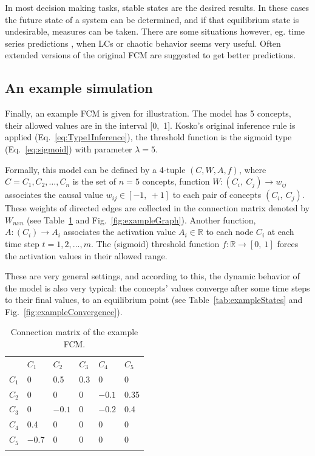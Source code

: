 \documentclass[graybox]{svmult}
\begin{document}
In most decision making tasks, stable states are the desired results. In these cases the future state of a system can be determined, and if that equilibrium state is undesirable, measures can be taken. There are some situations however, eg. time series predictions \cite{homenda2014modeling,homenda2017clustering,lu2014modeling}, when LCs or chaotic behavior seems very useful. Often extended versions of the original FCM are suggested to get better predictions.

\subsection{An example simulation}

Finally, an example FCM is given for illustration. The model has 5 concepts, their allowed values are in the interval [0,~1]. Kosko's original inference rule is applied (Eq.~\ref{eq:Type1Inference}), the threshold function is the sigmoid type (Eq.~\ref{eq:sigmoid}) with parameter $\lambda = 5$.

Formally, this model can be defined by a 4-tuple $(C, W, A, f)$, where $C = C_1, C_2,\dots, C_n$ is the set of $n=5$ concepts, function $W : (C_i,~C_j) \to w_{ij}$ associates the causal value $w_{ij} \in [-1,~+1]$ to each pair of concepts $(C_i,~C_j)$. These weights of directed edges are collected in the connection matrix denoted by $W_{nxn}$ (see Table~\ref{tab:exampleConnMtx} and Fig.~\ref{fig:exampleGraph}). Another function, $A : (C_i) \to A_i$ associates the activation value $A_i \in \mathbb{R}$ to each node $C_i$ at each time step $t = 1, 2,\dots, m$. The (sigmoid) threshold function $f : \mathbb{R} \to [0,~1]$ forces the activation values in their allowed range.

These are very general settings, and according to this, the dynamic behavior of the model is also very typical: the concepts' values converge after some time steps to their final values, to an equilibrium point (see Table~\ref{tab:exampleStates} and Fig.~\ref{fig:exampleConvergence}).

\begin{table}[!t]
\caption{Connection matrix of the example FCM.}
\label{tab:exampleConnMtx}
\begin{tabular}{p{1cm}|p{1cm}p{1cm}p{1cm}p{1cm}p{1cm}}
\hline\noalign{\smallskip}
 & $C_1$ & $C_2$ & $C_3$ & $C_4$ & $C_5$ \\
\noalign{\smallskip}\svhline\noalign{\smallskip}
$C_1$ & 0 & 0.5 & 0.3 & 0 & 0 \\
$C_2$ & 0 & 0 & 0 & $-0.1$ & 0.35 \\
$C_3$ & 0 & $-0.1$ & 0 & $-0.2$ & 0.4 \\
$C_4$ & 0.4 & 0 & 0 & 0 & 0 \\
$C_5$ & $-0.7$ & 0 & 0 & 0 & 0 \\
\noalign{\smallskip}\hline\noalign{\smallskip}
\end{tabular}
\end{table}
\end{document}
